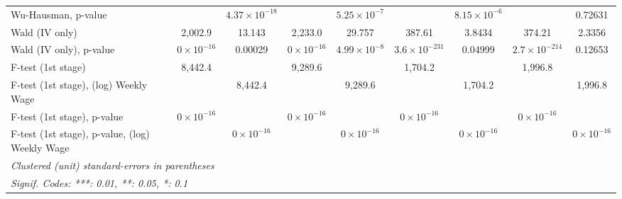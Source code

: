 \documentclass[
  10pt,
]{article}
\begin{document}
\begin{table}[htbp]
\begin{adjustbox}{max width=\linewidth}
\begin{tabular}{lcccccccc}
         Wu-Hausman, p-value                            &                     & $4.37\times 10^{-18}$   &                     & $5.25\times 10^{-7}$  &                        & $8.15\times 10^{-6}$                  &                        & 0.72631\\  
         Wald (IV only)                                 & 2,002.9             & 13.143                  & 2,233.0             & 29.757                & 387.61                 & 3.8434                                & 374.21                 & 2.3356\\  
         Wald (IV only), p-value                        & $0\times 10^{-16}$  & 0.00029                 & $0\times 10^{-16}$  & $4.99\times 10^{-8}$  & $3.6\times 10^{-231}$  & 0.04999                               & $2.7\times 10^{-214}$  & 0.12653\\  
         F-test (1st stage)                             & 8,442.4             &                         & 9,289.6             &                       & 1,704.2                &                                       & 1,996.8                & \\  
         F-test (1st stage), (log) Weekly Wage          &                     & 8,442.4                 &                     & 9,289.6               &                        & 1,704.2                               &                        & 1,996.8\\  
         F-test (1st stage), p-value                    & $0\times 10^{-16}$  &                         & $0\times 10^{-16}$  &                       & $0\times 10^{-16}$     &                                       & $0\times 10^{-16}$     & \\  
         F-test (1st stage), p-value, (log) Weekly Wage &                     & $0\times 10^{-16}$      &                     & $0\times 10^{-16}$    &                        & $0\times 10^{-16}$                    &                        & $0\times 10^{-16}$\\   
         \midrule \midrule
         \multicolumn{9}{l}{\emph{Clustered (unit) standard-errors in parentheses}}\\
         \multicolumn{9}{l}{\emph{Signif. Codes: ***: 0.01, **: 0.05, *: 0.1}}\\
      \end{tabular}
   \end{adjustbox}
\end{table}
\end{document}
